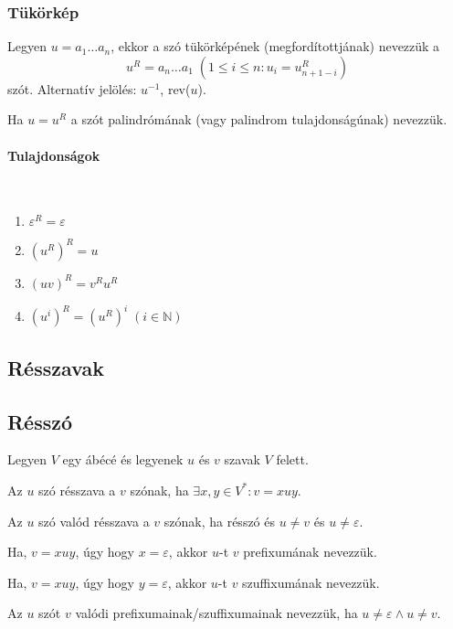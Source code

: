 \subsubsection{Tükörkép}
\begin{definition*}
	Legyen $ u = a_1 \dots a_n $, ekkor a szó tükörképének (megfordítottjának) nevezzük a
	\[
	u^R = a_n \dots a_1 \; (1 \le i \le n: u_i = u^R_{n+1-i})
	\]
	szót. Alternatív jelölés: $u^{-1}$, rev($ u $).
\end{definition*}
\begin{remark}
	Ha $u = u^R$ a szót palindrómának (vagy palindrom tulajdonságúnak) nevezzük.
\end{remark}

\paragraph{Tulajdonságok}\mbox{}\\[-20pt]

\begin{multicols}{2}
	\begin{enumerate}
		\item{$ \varepsilon^R = \varepsilon $}
		\item{$ \left(u^R \right)^R = u $}
		\item{$ \left( uv \right)^R = v^R u^R $}
		\item{$ \left( u^i \right)^R = \left( u^R \right)^i \; (i \in \mathbb{N}) $}
	\end{enumerate}
\end{multicols}
\subsection{Résszavak}
\subsection{Résszó}
Legyen $V$ egy ábécé és legyenek $u$ és $v$ szavak $V$ felett.
\begin{definition*}[résszó]
	Az $u$ szó résszava a $v$ szónak, ha $ \exists x,y \in V^*: v = xuy $.
\end{definition*}
\begin{definition*}
	Az $u$ szó valód résszava a $v$ szónak, ha résszó és $ u \ne v $ és $ u \ne \varepsilon $.
\end{definition*}
\begin{definition*}[prefixum]
	Ha, $ v = xuy$, úgy hogy $x = \varepsilon$, akkor $u$-t $v$ prefixumának nevezzük.
\end{definition*}
\begin{definition*}[szuffixum]
	Ha, $ v = xuy$, úgy hogy $y = \varepsilon$, akkor $u$-t $v$ szuffixumának nevezzük.
\end{definition*}
\noindent
Az $u$ szót $v$ valódi prefixumainak/szuffixumainak nevezzük, ha $u \ne \varepsilon \land u \ne v $.

